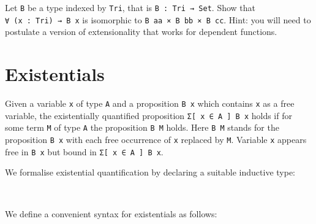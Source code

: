 Let \texttt{B} be a type indexed by \texttt{Tri}, that is
\texttt{B\ :\ Tri\ →\ Set}. Show that \texttt{∀\ (x\ :\ Tri)\ →\ B\ x}
is isomorphic to \texttt{B\ aa\ ×\ B\ bb\ ×\ B\ cc}. Hint: you will need
to postulate a version of extensionality that works for dependent
functions.

\hypertarget{existentials}{%
\section{Existentials}\label{existentials}}

Given a variable \texttt{x} of type \texttt{A} and a proposition
\texttt{B\ x} which contains \texttt{x} as a free variable, the
existentially quantified proposition \texttt{Σ{[}\ x\ ∈\ A\ {]}\ B\ x}
holds if for some term \texttt{M} of type \texttt{A} the proposition
\texttt{B\ M} holds. Here \texttt{B\ M} stands for the proposition
\texttt{B\ x} with each free occurrence of \texttt{x} replaced by
\texttt{M}. Variable \texttt{x} appears free in \texttt{B\ x} but bound
in \texttt{Σ{[}\ x\ ∈\ A\ {]}\ B\ x}.

We formalise existential quantification by declaring a suitable
inductive type:

\begin{fence}
\begin{code}%
\>[0]\AgdaSpace{}%
\AgdaSpace{}%
\AgdaSymbol{(}\AgdaSpace{}%
\AgdaSymbol{:}\AgdaSpace{}%
\AgdaSymbol{)}\AgdaSpace{}%
\AgdaSymbol{(}\AgdaSpace{}%
\AgdaSymbol{:}\AgdaSpace{}%
\AgdaSpace{}%
\AgdaSpace{}%
\AgdaSymbol{)}\AgdaSpace{}%
\AgdaSymbol{:}\AgdaSpace{}%
\AgdaSpace{}%
\<%
\\
\>[0][@{}l@{\AgdaIndent{0}}]%
\>[2]\AgdaSpace{}%
\AgdaSymbol{:}\AgdaSpace{}%
\AgdaSymbol{(}\AgdaSpace{}%
\AgdaSymbol{:}\AgdaSpace{}%
\AgdaSymbol{)}\AgdaSpace{}%
\AgdaSpace{}%
\AgdaSpace{}%
\AgdaSpace{}%
\AgdaSpace{}%
\AgdaSpace{}%
\AgdaSpace{}%
\<%
\end{code}
\end{fence}

We define a convenient syntax for existentials as follows:

